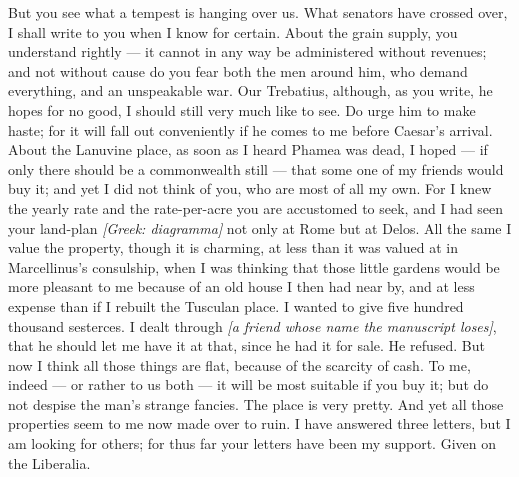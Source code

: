  But you see what a tempest is hanging over us. What senators have crossed over, I shall write to you when I know for certain. About the grain supply, you understand rightly --- it cannot in any way be administered without revenues; and not without cause do you fear both the men around him, who demand everything, and an unspeakable war. Our Trebatius, although, as you write, he hopes for no good, I should still very much like to see. Do urge him to make haste; for it will fall out conveniently if he comes to me before Caesar's arrival. About the Lanuvine place, as soon as I heard Phamea was dead, I hoped --- if only there should be a commonwealth still --- that some one of my friends would buy it; and yet I did not think of you, who are most of all my own. For I knew the yearly rate and the rate-per-acre you are accustomed to seek, and I had seen your land-plan \textit{[Greek: diagramma]} not only at Rome but at Delos. All the same I value the property, though it is charming, at less than it was valued at in Marcellinus's consulship, when I was thinking that those little gardens would be more pleasant to me because of an old house I then had near by, and at less expense than if I rebuilt the Tusculan place. I wanted to give five hundred thousand sesterces. I dealt through \textit{[a friend whose name the manuscript loses]}, that he should let me have it at that, since he had it for sale. He refused. But now I think all those things are flat, because of the scarcity of cash. To me, indeed --- or rather to us both --- it will be most suitable if you buy it; but do not despise the man's strange fancies. The place is very pretty. And yet all those properties seem to me now made over to ruin. I have answered three letters, but I am looking for others; for thus far your letters have been my support. Given on the Liberalia.
